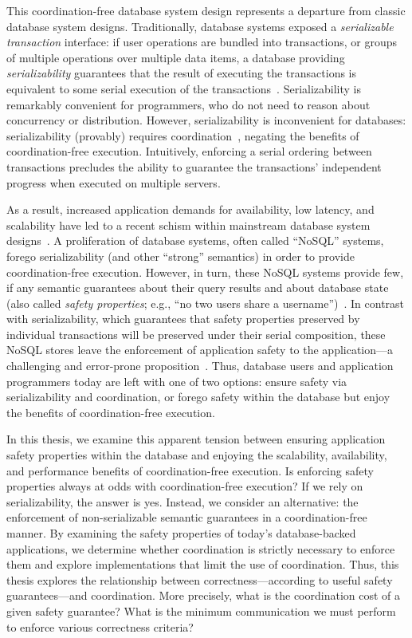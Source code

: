 This coordination-free database system design represents a departure from
classic database system designs. Traditionally, database systems
exposed a \textit{serializable transaction} interface: if user
operations are bundled into transactions, or groups of multiple
operations over multiple data items, a database providing
\textit{serializability} guarantees that the result of executing the
transactions is equivalent to some serial execution of the
transactions~\cite{bernstein-book}. Serializability is remarkably
convenient for programmers, who do not need to reason about
concurrency or distribution. However, serializability is inconvenient
for databases: serializability (provably) requires
coordination~\cite{davidson-survey}, negating the benefits of
coordination-free execution. Intuitively, enforcing a serial ordering
between transactions precludes the ability to guarantee
the transactions' independent progress when executed on multiple
servers.

As a result, increased application demands for availability, low
latency, and scalability have led to a recent schism within mainstream
database system designs~\cite{marcus-talk,mohan-note}.  A
proliferation of database systems, often called ``NoSQL'' systems,
forego serializability (and other ``strong'' semantics) in order to
provide coordination-free execution. However, in turn, these NoSQL
systems provide few, if any semantic guarantees about their query
results and about database state (also called \textit{safety
  properties}; e.g., ``no two users share a
username'')~\cite{queue,bernstein-survey,lamport-safety}. In contrast
with serializability, which guarantees that safety properties
preserved by individual transactions will be preserved under their
serial composition, these NoSQL stores leave the enforcement of
application safety to the application---a challenging and error-prone
proposition~\cite{consistency-borders,entitygroup}. Thus, database users and application programmers today
are left with one of two options: ensure safety via serializability
and coordination, or forego safety within the database but enjoy the benefits of
coordination-free execution.

In this thesis, we examine this apparent tension between ensuring
application safety properties within the database and enjoying the
scalability, availability, and performance benefits of
coordination-free execution. Is enforcing safety properties always at
odds with coordination-free execution? If we rely on serializability,
the answer is yes. Instead, we consider an alternative: the
enforcement of non-serializable semantic guarantees in a
coordination-free manner. By examining the safety properties of
today's database-backed applications, we determine whether
coordination is strictly necessary to enforce them and explore
implementations that limit the use of coordination. Thus, this thesis
explores the relationship between correctness---according to useful
safety guarantees---and coordination. More precisely, what is the
coordination cost of a given safety guarantee? What is the minimum
communication we must perform to enforce various correctness criteria?

